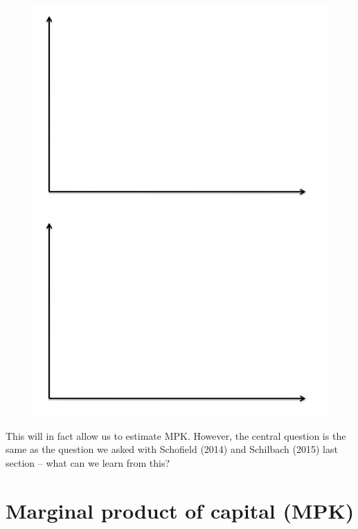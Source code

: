\documentclass[12pt,english]{article}
\begin{document}
\begin{figure}[H]
	\begin{minipage}{.5\textwidth}
		\centering
		\includegraphics[width = \textwidth]{axes.png}
	\end{minipage}
	\begin{minipage}{.5\textwidth}
		\centering
		\includegraphics[width = \textwidth]{axes.png}
	\end{minipage}
\end{figure}

This will in fact allow us to estimate MPK. However, the central question is the same as the question we asked with Schofield (2014) and Schilbach (2015) last section -- what can we learn from this?

\section{Marginal product of capital (MPK)}
\end{document}
